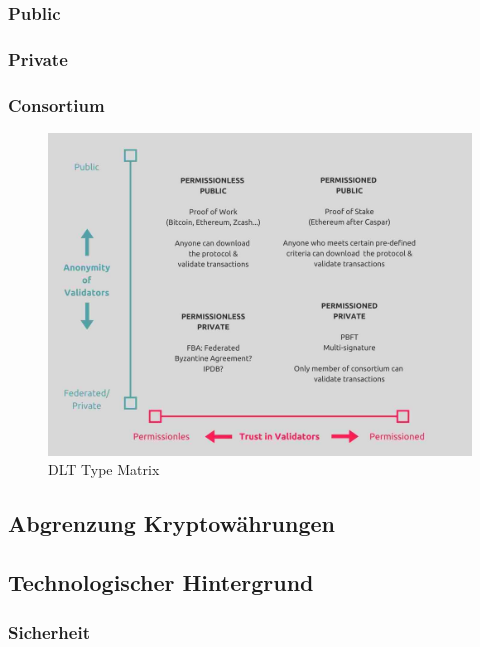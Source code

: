 \subsubsection{Public}


\subsubsection{Private}


\subsubsection{Consortium}
\begin{figure}[h!]
	\centering
	\includegraphics[width=1.0\linewidth]{pictures/dlt-type-matrix}
	\caption[DLT Type Matrix]{DLT Type Matrix}
	\label{fig:dlt-type-matrix}
\end{figure}

\subsection{Abgrenzung Kryptowährungen}


\subsection{Technologischer Hintergrund}


\subsubsection{Sicherheit} \label{tec_bkgrnd_sec}


